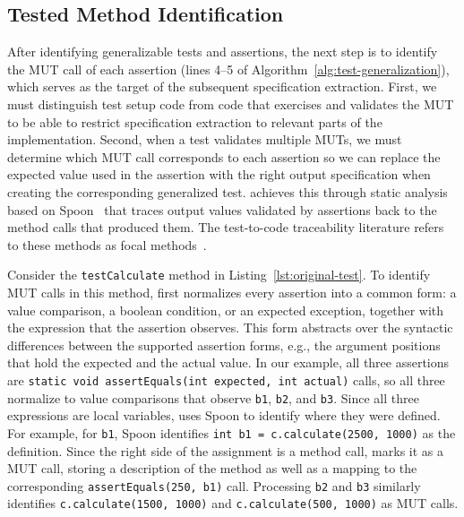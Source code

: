 \subsection{Tested Method Identification}%
\label{sec:tested-method-identification}

After identifying generalizable tests and assertions,
the next step is to identify the MUT call of each assertion
(lines 4--5 of Algorithm~\ref{alg:test-generalization}),
which serves as the target of the subsequent specification extraction.
First, we must distinguish test setup code
from code that exercises and validates the MUT
to be able to restrict specification extraction
to relevant parts of the implementation.
Second, when a test validates multiple MUTs,
we must determine which MUT call corresponds to each assertion
so we can replace the expected value used in the assertion
with the right output specification when creating the corresponding generalized test.
\ToolTeralizer{} achieves this
through static analysis based on Spoon~\cite{pawlak_2016_spoon}
that traces output values validated by assertions
back to the method calls that produced them.
The test-to-code traceability literature refers to these methods
as focal methods~\cite{ghafari_2015_focal,he_2024_focal}.

Consider the \texttt{testCalculate} method in Listing~\ref{lst:original-test}.
To identify MUT calls in this method,
\ToolTeralizer{} first normalizes every assertion into a common form:
a value comparison, a boolean condition, or an expected exception,
together with the expression that the assertion observes.
This form abstracts over the syntactic differences between the supported assertion forms,
e.g., the argument positions that hold the expected and the actual value.
In our example, all three assertions are \texttt{static void assertEquals(int expected, int actual)} calls,
so all three normalize to value comparisons
that observe \texttt{b1}, \texttt{b2}, and \texttt{b3}.
Since all three expressions are local variables,
\ToolTeralizer{} uses Spoon to identify where they were defined.
For example, for \texttt{b1}, Spoon identifies \texttt{int b1 = c.calculate(2500, 1000)} as the definition.
Since the right side of the assignment is a method call,
\ToolTeralizer{} marks it as a MUT call, storing a description of the method
as well as a mapping to the corresponding \texttt{assertEquals(250, b1)} call.
Processing \texttt{b2} and \texttt{b3} similarly identifies
\texttt{c.calculate(1500, 1000)} and \texttt{c.calculate(500, 1000)} as MUT calls.

